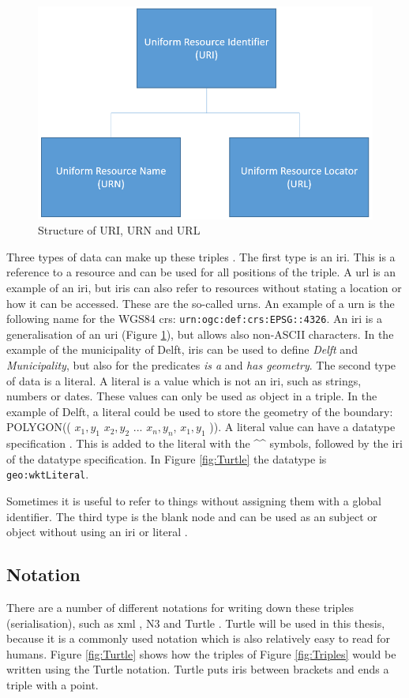 \begin{figure}
	\centering
	\includegraphics[width=0.6\linewidth]{figs/URI.png}
	\caption{Structure of URI, URN and URL}
	\label{fig:URI}
\end{figure}

\begin{sloppypar}
Three types of data can make up these triples \citep{LD:W3C6}. The first type is an \ac{iri}. This is a reference to a resource and can be used for all positions of the triple. A \acf{url} is an example of an \ac{iri}, but \ac{iri}s can also refer to resources without stating a location or how it can be accessed. These are the so-called \acp{urn}. An example of a \ac{urn} is the following name for the WGS84 \ac{crs}: \texttt{urn:ogc:def:crs:EPSG::4326}. An \ac{iri} is a generalisation of an \ac{uri} (Figure \ref{fig:URI}), but allows also non-ASCII characters. In the example of the municipality of Delft, \ac{iri}s can be used to define \textit{Delft} and \textit{Municipality}, but also for the predicates \textit{is a} and \textit{has geometry}. The second type of data is a literal. A literal is a value which is not an \ac{iri}, such as strings, numbers or dates. These values can only be used as object in a triple. In the example of Delft, a literal could be used to store the geometry of the boundary: POLYGON(( $x_{1},y_{1}$ $x_{2},y_{2}$ ... $x_{n},y_{n}$, $x_{1},y_{1}$ )). A literal value can have a datatype specification \citep{LD:W3C7}. This is added to the literal with the \^{}\^{} symbols, followed by the \ac{iri} of the datatype specification. In Figure \ref{fig:Turtle} the datatype is \texttt{geo:wktLiteral}.
\end{sloppypar}

Sometimes it is useful to refer to things without assigning them with a global identifier. The third type is the blank node and can be used as an subject or object without using an \ac{iri} or literal \citep{LD:W3C6}.  


\subsection{Notation}
\label{par:notation}
There are a number of different notations for writing down these triples (serialisation), such as \ac{xml} \citep{LD:W3C3}, N3 \citep{LD:W3C5} and Turtle \citep{LD:W3C4}. Turtle will be used in this thesis, because it is a commonly used notation which is also relatively easy to read for humans. Figure \ref{fig:Turtle} shows how the triples of Figure \ref{fig:Triples} would be written using the Turtle notation. Turtle puts \acp{iri} between brackets and ends a triple with a point. 

